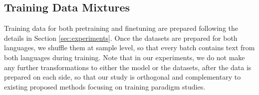 \subsection{Training Data Mixtures}
Training data for both pretraining and finetuning are prepared following the details in Section \ref{sec:experiments}. Once the datasets are prepared for both languages, we shuffle them at sample level, so that every batch contains text from both languages during training. Note that in our experiments, we do not make any further transformations to either the model or the datasets, after the data is prepared on each side, so that our study is orthogonal and complementary to existing proposed methods \cite{cahyawijaya2023instructalign, pfeiffer-etal-2020-mad, liu2022few, yong2023bloom1, ye2023language} focusing on training paradigm studies. 



